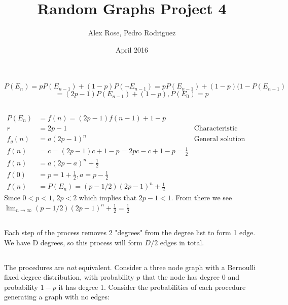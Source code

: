 \documentclass{article}
\title{\vspace{-5ex}Random Graphs Project 4}
\author{Alex Rose, Pedro Rodriguez}
\date{April 2016}
\begin{document}
\maketitle
\vspace{-15ex}
\section{}
\subsection{ }
\vspace{-2ex}
$$P(E_n) = pP(E_{n-1}) + (1-p)P(\neg E_{n-1}) = pP(E_{n-1}) + (1-p)(1- P(E_{n-1}) $$
$$ = (2p-1)P(E_{n-1}) + (1 - p), P(E_0) = p$$
\vspace{-6ex}
\subsection{} 
\vspace{-2ex}
$$
\begin{aligned}
P(E_n)&=f(n)=(2p-1)f(n-1)+1-p\\
r&=2p-1&\text{Characteristic function}\\
f_g(n)&=a(2p-1)^n&\text{General solution}\\
f(n)&=c=(2p-1)c+1-p=2pc-c+1-p=\frac{1}{2}\\
f(n)&=a(2p-a)^n+\frac{1}{2}\\
f(0)&=p=1+\frac{1}{2},a=p-\frac{1}{2}\\
f(n)&=P(E_n)=(p-1/2)(2p-1)^n+\frac{1}{2}
\end{aligned}
$$
Since $0<p<1$, $2p<2$ which implies that $2p-1<1$. From there we see $\lim_{n\rightarrow\infty}(p-1/2)(2p-1)^n+\frac{1}{2}=\frac{1}{2}$

\vspace{-2ex}
\subsection{}
\vspace{-2ex}
Each step of the process removes 2 "degrees" from the degree list to form 1 edge. We have D degrees, so this process will form $D/2$ edges in total.
\vspace{-2ex}
\subsection{}
\vspace{-2ex}
 The procedures are \textit{not} equivalent. Consider a three node graph with a Bernoulli fixed degree distribution, with probability $p$ that the node has degree 0 and probability $1-p$ it has degree 1.  Consider the probabilities of each procedure generating a graph with no edges: \\
 
\end{document}
